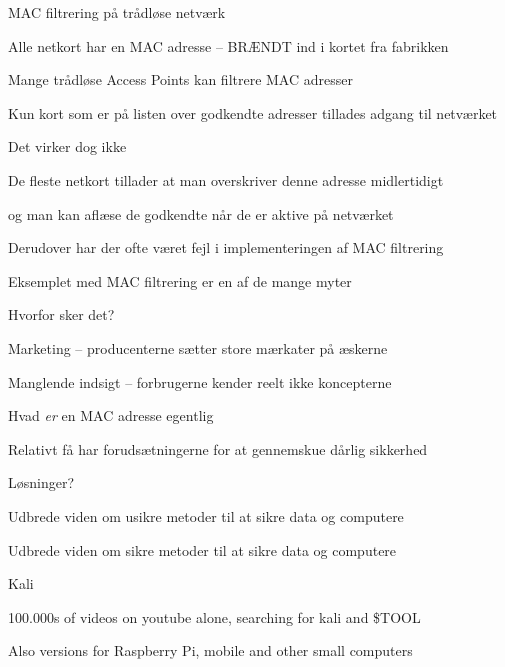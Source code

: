 \documentclass[Screen16to9,17pt]{foils}
\begin{document}
\begin{list1}
\item MAC filtrering på trådløse netværk
\item Alle netkort har en MAC adresse -- BRÆNDT ind i kortet fra fabrikken
\item Mange trådløse Access Points kan filtrere MAC adresser
\item Kun kort som er på listen over godkendte adresser tillades adgang til netværket

\item Det virker dog ikke \smiley
\item De fleste netkort tillader at man overskriver denne adresse midlertidigt
\item og man kan aflæse de godkendte når de er aktive på netværket
\item Derudover har der ofte været fejl i implementeringen af MAC filtrering
\end{list1}


\begin{list1}
\item Eksemplet med MAC filtrering er en af de mange myter
\item Hvorfor sker det?
\item Marketing -- producenterne sætter store mærkater på æskerne
\item Manglende indsigt -- forbrugerne kender reelt ikke koncepterne
\item Hvad \emph{er} en MAC adresse egentlig
\item Relativt få har forudsætningerne for at gennemskue dårlig sikkerhed
\item Løsninger?

\item Udbrede viden om usikre metoder til at sikre data og computere
\item Udbrede viden om sikre metoder til at sikre data og computere
\end{list1}







\begin{list1}
\item  Kali 
\item 100.000s of videos on youtube alone, searching for kali and \$TOOL
\item Also versions for Raspberry Pi, mobile and other small computers
\end{list1}
\end{document}
